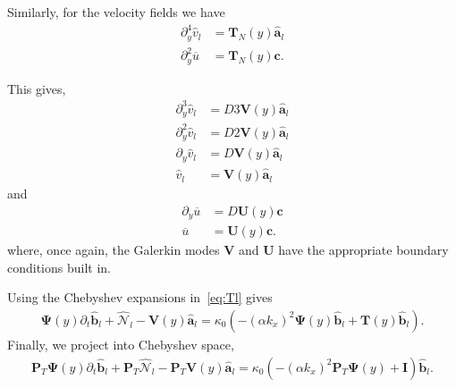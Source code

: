 \documentclass[12pt]{article}
\newcommand{\lr}[1]{\left(#1\right)}
\newcommand{\wh}[1]{\widehat{#1}}
\newcommand{\ua}{\overline{u}}
\begin{document}
    Similarly, for the velocity fields we have 
    \begin{align}
      \partial_{y}^{4}\wh{v}_{l} &= \mathbf{T}_{N}\lr{y}\wh{\mathbf{a}}_{l} \\
      \partial_{y}^{2}\ua        &= \mathbf{T}_{N}\lr{y}\mathbf{c}.
    \end{align}
    
    
    This gives, 
    \begin{align}
      \partial_{y}^{3}\wh{v}_{l} &= D3\mathbf{V}\lr{y}\wh{\mathbf{a}}_{l} \\
      \partial_{y}^{2}\wh{v}_{l} &= D2\mathbf{V}\lr{y}\wh{\mathbf{a}}_{l} \\
      \partial_{y}\wh{v}_{l} &= D\mathbf{V}\lr{y}\wh{\mathbf{a}}_{l} \\
      \wh{v}_{l} &= \mathbf{V}\lr{y}\wh{\mathbf{a}}_{l}
    \end{align}
    and 
    \begin{align}
      \partial_{y}\ua &= D\mathbf{U}\lr{y}\mathbf{c} \\
                  \ua &= \mathbf{U}\lr{y}\mathbf{c}.
    \end{align}
    where, once again, the Galerkin modes $\mathbf{V}$ and $\mathbf{U}$ 
    have the appropriate boundary conditions built in.

%    

    Using the Chebyshev expansions in~\eqref{eq:Tl} gives 
    \begin{align}
      \boldsymbol{\Psi}\lr{y}\partial_{t}\wh{\mathbf{b}}_{l} + \wh{\mathcal{N}}_{l} - 
      \mathbf{V}\lr{y}\wh{\mathbf{a}}_{l} = 
      \kappa_{0}\lr{-\lr{\alpha k_{x}}^{2}\boldsymbol{\Psi}\lr{y}\wh{\mathbf{b}}_{l} + 
                    \mathbf{T}\lr{y}\wh{\mathbf{b}}_{l}}.
    \end{align}
    Finally, we project into Chebyshev space, 
    \begin{align}
      \mathbf{P}_{T}\boldsymbol{\Psi}\lr{y}\partial_{t}\wh{\mathbf{b}}_{l} + \mathbf{P}_{T}\wh{\mathcal{N}}_{l} - 
      \mathbf{P}_{T}\mathbf{V}\lr{y}\wh{\mathbf{a}}_{l} = 
      \kappa_{0}\lr{-\lr{\alpha k_{x}}^{2}\mathbf{P}_{T}\boldsymbol{\Psi}\lr{y} + \mathbf{I}}\wh{\mathbf{b}}_{l}.
    \end{align}
\end{document}
